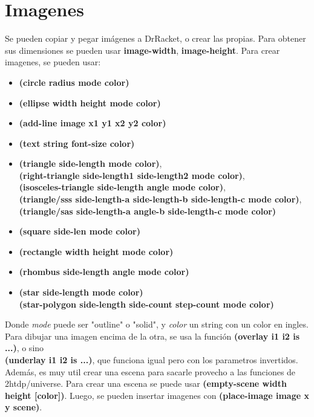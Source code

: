 \documentclass[11pt,a4paper]{article}
\begin{document}
\section{Imagenes}
Se pueden copiar y pegar imágenes a DrRacket, o crear las propias. Para obtener sus dimensiones se pueden usar \textbf{image-width}, \textbf{image-height}. Para crear imagenes, se pueden usar:
\begin{itemize}
\item \textbf{(circle radius mode color)}
\item \textbf{(ellipse width height mode color)}
\item \textbf{(add-line image x1 y1 x2 y2 color)}
\item \textbf{(text string font-size color)}
\item \textbf{(triangle side-length mode color)},\\ \textbf{(right-triangle side-length1 side-length2 mode color)},\\ \textbf{(isosceles-triangle side-length angle mode color)},\\ \textbf{(triangle/sss side-length-a side-length-b side-length-c mode color)},\\ \textbf{(triangle/sas side-length-a angle-b side-length-c mode color)}
\item \textbf{(square side-len mode color)}
\item \textbf{(rectangle width height mode color)}
\item \textbf{(rhombus side-length angle mode color)}
\item \textbf{(star side-length mode color)}\\ \textbf{(star-polygon side-length side-count step-count mode color)}
\end{itemize}

Donde \textit{mode} puede ser "outline" o "solid", y \textit{color} un string con un color en ingles.\\

Para dibujar una imagen encima de la otra, se usa la funci\'on \textbf{(overlay i1 i2 is ...)}, o sino\\ \textbf{(underlay i1 i2 is ...)}, que funciona igual pero con los parametros invertidos.\\

Adem\'as, es muy util crear una escena para sacarle provecho a las funciones de 2htdp/universe. Para crear una escena se puede usar \textbf{(empty-scene width height [color])}. Luego, se pueden insertar imagenes con \textbf{(place-image image x y scene)}.
\end{document}
